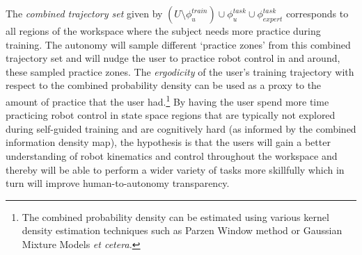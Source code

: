 \documentclass[12pt]{article}
\begin{document}
The \textit{combined trajectory set} given by $(U \setminus \phi_{u}^{train}) \cup \phi_{u}^{task} \cup  \phi_{expert}^{task}$  corresponds to all regions of the workspace where the subject needs more practice during training. The autonomy will sample different `practice zones' from this combined trajectory set and will nudge the user to practice robot control in and around, these sampled practice zones. The \textit{ergodicity} of the user's training trajectory with respect to the combined probability density can be used as a proxy to the amount of practice that the user had.\footnote{The combined probability density can be estimated using various kernel density estimation techniques such as Parzen Window method or Gaussian Mixture Models \textit{et cetera.}} By having the user spend more time practicing robot control in state space regions that are typically not explored during self-guided training and are cognitively hard (as informed by the combined information density map), the hypothesis is that the users will gain a better understanding of robot kinematics and control throughout the workspace and thereby will be able to perform a wider variety of tasks more skillfully which in turn will improve human-to-autonomy transparency.
% 
%
%
%
%
\end{document}
